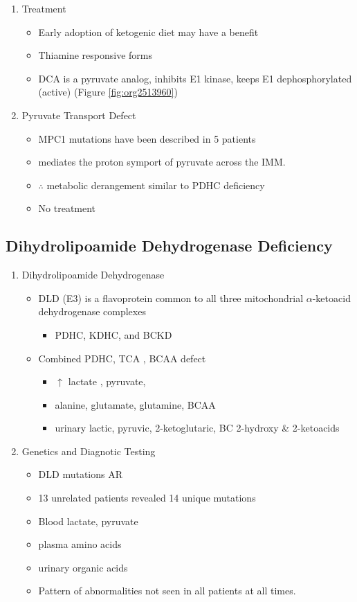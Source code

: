 \documentclass{scrartcl}
\begin{document}
\begin{enumerate}
\item Treatment
\label{sec:org70325d6}
\begin{itemize}
\item Early adoption of ketogenic diet may have a benefit
\item Thiamine responsive forms
\item DCA is a pyruvate analog, inhibits E1 kinase, keeps E1 dephosphorylated (active) (Figure \ref{fig:org2513960})
\end{itemize}

\item Pyruvate Transport Defect
\label{sec:org3bd9f89}
\begin{itemize}
\item MPC1 mutations have been described in 5 patients
\item mediates the proton symport of pyruvate across the IMM.
\item \(\therefore\) metabolic derangement similar to PDHC deficiency
\item No treatment
\end{itemize}
\end{enumerate}

\subsection{Dihydrolipoamide Dehydrogenase Deficiency}
\label{sec:orgdd17ad6}
\begin{enumerate}
\item Dihydrolipoamide Dehydrogenase
\label{sec:org3a8e255}
\begin{itemize}
\item DLD (E3) is a flavoprotein common to all three mitochondrial
\(\alpha\)-ketoacid dehydrogenase complexes
\begin{itemize}
\item PDHC, KDHC, and BCKD
\end{itemize}
\item Combined PDHC, TCA , BCAA defect
\begin{itemize}
\item \(\uparrow\) lactate , pyruvate,
\item alanine, glutamate, glutamine, BCAA
\item urinary lactic, pyruvic, 2-ketoglutaric, BC 2-hydroxy \& 2-ketoacids
\end{itemize}
\end{itemize}

\item Genetics and Diagnotic Testing
\label{sec:org5395c97}
\begin{itemize}
\item DLD mutations AR
\item 13 unrelated patients revealed 14 unique mutations
\item Blood lactate, pyruvate
\item plasma amino acids
\item urinary organic acids
\item Pattern of abnormalities not seen in all patients at all times.
\end{itemize}
\end{enumerate}
\end{document}
